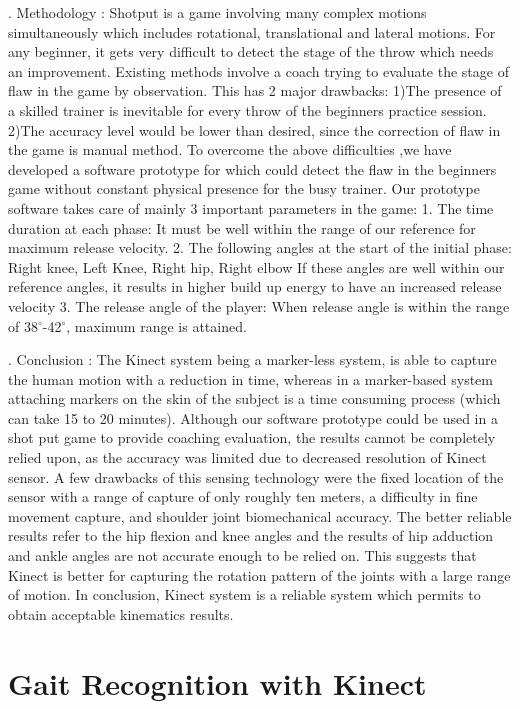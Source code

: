 . Methodology :
\noindent Shotput is a game involving many complex motions simultaneously which includes rotational, translational and lateral motions. For any beginner, it gets very difficult to detect the stage of the throw which needs an improvement. Existing methods involve a coach trying to evaluate the stage of flaw in the game by observation. This has 2 major drawbacks: 1)The presence of a skilled trainer is inevitable for every throw of the beginners practice session. 2)The accuracy level would be lower than desired, since the correction of flaw in the game is manual method. To overcome the above difficulties ,we have developed a software prototype for which could detect the flaw in the beginners game without constant physical presence for the busy trainer.
Our prototype software takes care of mainly 3 important parameters in the game:
1. The time duration at each phase:
It must be well within the range of our reference  for maximum release velocity.
2. The following angles at the start of the initial phase: Right knee, Left Knee, Right hip, Right elbow
If these angles are well within our reference angles, it results in higher build up energy to
have an increased release velocity
3. The release angle of the player:
When release angle is within the range of 38$^{\circ}$-42$^{\circ}$, maximum range is attained.

. Conclusion :
\noindent The Kinect system being a marker-less system, is able to capture the human motion with a reduction in time, whereas in a marker-based system attaching markers on the skin of the subject is a time consuming process (which can take 15 to 20 minutes). Although our software prototype could be used in a shot put game to provide coaching evaluation, the results cannot be completely relied upon, as the accuracy was limited due to decreased resolution of Kinect sensor. A few drawbacks of this sensing technology were the fixed location of the sensor with a range of capture of only roughly ten meters, a difficulty in fine movement capture, and shoulder joint biomechanical accuracy. The better reliable results refer to the hip flexion and knee angles and the results of hip adduction and ankle angles are not accurate enough to be relied on. This suggests that Kinect is better for capturing the rotation pattern of the joints with a large range of motion. In conclusion, Kinect system is a reliable system which permits to obtain acceptable kinematics results.

\newpage

\section{Gait Recognition with Kinect} \label{Gait Recognition with Kinect}

